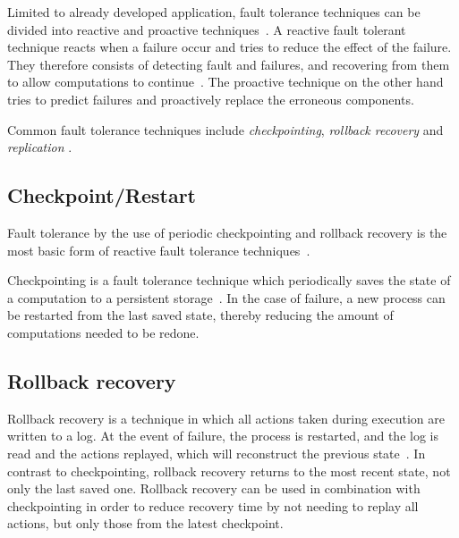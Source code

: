 \documentclass{cslthse-msc}
\begin{document}
Limited to already developed application, fault tolerance techniques can be divided into reactive and proactive techniques~\cite{faultToleranceChallenges}. A reactive fault tolerant technique reacts when a failure occur and tries to reduce the effect of the failure. They therefore consists of detecting fault and failures, and recovering from them to allow computations to continue~\cite{relGridSystems}. The proactive technique on the other hand tries to predict failures and proactively replace the erroneous components.

Common fault tolerance techniques include \emph{checkpointing}, \emph{rollback recovery} and \emph{replication} \cite{relGridSystems}.

\subsection{Checkpoint/Restart} \label{subsec:background_checkpoint}
Fault tolerance by the use of periodic checkpointing and rollback recovery is the most basic form of reactive fault tolerance techniques~\cite{surveyFaultParallel}.

Checkpointing is a fault tolerance technique which periodically saves the state of a computation to a persistent storage~\cite{relGridSystems, surveyFaultParallel}. In the case of failure, a new process can be restarted from the last saved state, thereby reducing the amount of computations needed to be redone.


\subsection{Rollback recovery} \label{subsec:background_rollback}
Rollback recovery is a technique in which all actions taken during execution are written to a log. At the event of failure, the process is restarted, and the log is read and the actions replayed, which will reconstruct the previous state~\cite{surveyFaultParallel}. In contrast to checkpointing, rollback recovery returns to the most recent state, not only the last saved one. Rollback recovery can be used in combination with checkpointing in order to reduce recovery time by not needing to replay all actions, but only those from the latest checkpoint.
\end{document}
